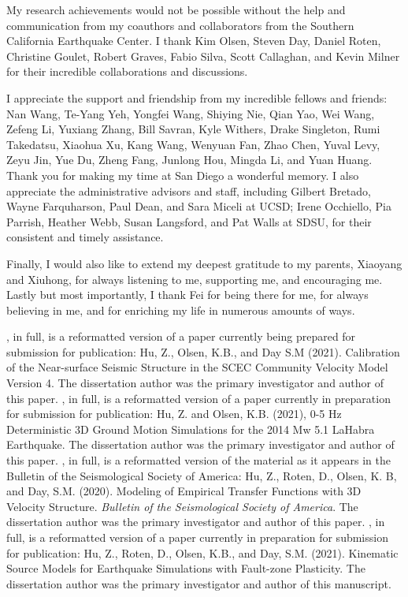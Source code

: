 \begin{frontmatter}
\begin{acknowledgements}
        My research achievements would not be possible without the help and communication from my coauthors and collaborators from the Southern California Earthquake Center. I thank Kim Olsen, Steven Day, Daniel Roten, Christine Goulet, Robert Graves, Fabio Silva, Scott Callaghan, and Kevin Milner for their incredible collaborations and discussions.

        I appreciate the support and friendship from my incredible fellows and friends: Nan Wang, Te-Yang Yeh, Yongfei Wang, Shiying Nie, Qian Yao, Wei Wang, Zefeng Li, Yuxiang Zhang, Bill Savran, Kyle Withers, Drake Singleton, Rumi Takedatsu, Xiaohua Xu, Kang Wang, Wenyuan Fan, Zhao Chen, Yuval Levy, Zeyu Jin, Yue Du, Zheng Fang, Junlong Hou, Mingda Li, and Yuan Huang. Thank you for making my time at San Diego a wonderful memory. I also appreciate the administrative advisors and staff, including Gilbert Bretado, Wayne Farquharson, Paul Dean, and Sara Miceli at UCSD; Irene Occhiello, Pia Parrish, Heather Webb, Susan Langsford, and Pat Walls at SDSU, for their consistent and timely assistance.

        Finally, I would also like to extend my deepest gratitude to my parents, Xiaoyang and Xiuhong, for always listening to me, supporting me, and encouraging me. Lastly but most importantly, I thank Fei for being there for me, for always believing in me, and for enriching my life in numerous amounts of ways.

        \bigskip

        
        , in full, is a reformatted version of a paper currently being prepared for submission for publication: Hu, Z., Olsen, K.B., and Day S.M (2021). Calibration of the Near-surface Seismic Structure in the SCEC Community Velocity Model Version 4.
        The dissertation author was the primary investigator and author of this paper.
        , in full, is a reformatted version of a paper currently in preparation for submission for publication: Hu, Z. and Olsen, K.B. (2021), 0-5 Hz Deterministic 3D Ground Motion Simulations for the 2014 Mw 5.1 LaHabra Earthquake. The dissertation author was the primary investigator and author of this paper.
        , in full, is a reformatted version of the material as it appears in the Bulletin of the Seismological Society of America: Hu, Z., Roten, D., Olsen, K. B, and Day, S.M. (2020). Modeling of Empirical Transfer Functions with 3D Velocity Structure. \emph{Bulletin of the Seismological Society of America}.
        The dissertation author was the primary investigator and author of this paper.
        , in full, is a reformatted version of a paper currently in preparation for submission for publication: Hu, Z., Roten, D., Olsen, K.B., and Day, S.M. (2021). Kinematic Source Models for Earthquake Simulations with Fault-zone Plasticity. The dissertation author was the primary investigator and author of this manuscript.
        


\end{acknowledgements}
\end{frontmatter}
